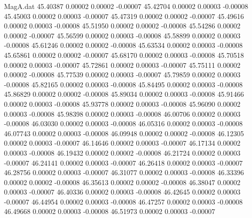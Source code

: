 \begin{filecontents}{MagA.dat}
  45.40387    0.00002    0.00002   -0.00007
  45.42704    0.00002    0.00003   -0.00008
  45.45003    0.00002    0.00003   -0.00007
  45.47319    0.00002    0.00002   -0.00007
  45.49616    0.00002    0.00003   -0.00008
  45.51950    0.00002    0.00002   -0.00008
  45.54286    0.00002    0.00002   -0.00007
  45.56599    0.00002    0.00003   -0.00008
  45.58899    0.00002    0.00003   -0.00008
  45.61246    0.00002    0.00002   -0.00008
  45.63534    0.00002    0.00003   -0.00008
  45.65861    0.00002    0.00002   -0.00007
  45.68170    0.00002    0.00003   -0.00008
  45.70518    0.00002    0.00003   -0.00007
  45.72861    0.00002    0.00003   -0.00007
  45.75111    0.00002    0.00002   -0.00008
  45.77539    0.00002    0.00003   -0.00007
  45.79859    0.00002    0.00003   -0.00008
  45.82165    0.00002    0.00003   -0.00008
  45.84495    0.00002    0.00003   -0.00008
  45.86829    0.00002    0.00002   -0.00008
  45.89034    0.00002    0.00003   -0.00008
  45.91466    0.00002    0.00003   -0.00008
  45.93778    0.00002    0.00003   -0.00008
  45.96090    0.00002    0.00003   -0.00008
  45.98398    0.00002    0.00003   -0.00008
  46.00706    0.00002    0.00003   -0.00008
  46.03030    0.00002    0.00003   -0.00008
  46.05316    0.00002    0.00003   -0.00008
  46.07743    0.00002    0.00003   -0.00008
  46.09948    0.00002    0.00002   -0.00008
  46.12305    0.00002    0.00003   -0.00007
  46.14646    0.00002    0.00003   -0.00007
  46.17134    0.00002    0.00003   -0.00008
  46.19432    0.00002    0.00002   -0.00008
  46.21724    0.00002    0.00003   -0.00007
  46.24141    0.00002    0.00003   -0.00007
  46.26418    0.00002    0.00003   -0.00007
  46.28756    0.00002    0.00003   -0.00007
  46.31077    0.00002    0.00003   -0.00008
  46.33396    0.00002    0.00002   -0.00008
  46.35613    0.00002    0.00002   -0.00008
  46.38047    0.00002    0.00003   -0.00007
  46.40336    0.00002    0.00003   -0.00008
  46.42645    0.00002    0.00003   -0.00007
  46.44954    0.00002    0.00003   -0.00008
  46.47257    0.00002    0.00003   -0.00008
  46.49668    0.00002    0.00003   -0.00008
  46.51973    0.00002    0.00003   -0.00007
\end{filecontents}
